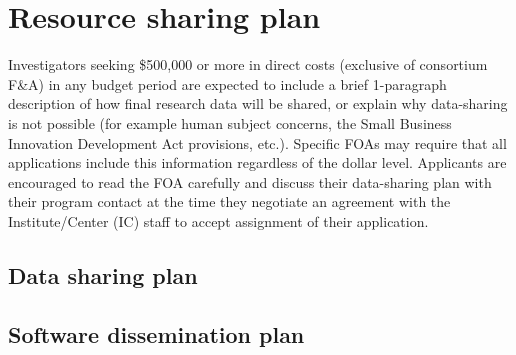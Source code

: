 \documentclass[11pt]{article}
\newcommand{\instructions}[1]{}
\renewcommand{\instructions}[1]{{\scriptsize \sc #1}}
\begin{document}
\clearpage


\renewcommand{\refname}{\raggedright Bibliography \& References Cited}



\clearpage
\section*{Resource sharing plan}

\instructions{Investigators seeking \$500,000 or more in direct costs
  (exclusive of consortium F\&A) in any budget period are expected to
  include a brief 1-paragraph description of how final research data
  will be shared, or explain why data-sharing is not possible (for
  example human subject concerns, the Small Business Innovation
  Development Act provisions, etc.). Specific FOAs may require that
  all applications include this information regardless of the dollar
  level. Applicants are encouraged to read the FOA carefully and
  discuss their data-sharing plan with their program contact at the
  time they negotiate an agreement with the Institute/Center (IC)
  staff to accept assignment of their application.}

\subsection*{Data sharing plan}


\subsection*{Software dissemination plan}
\end{document}
